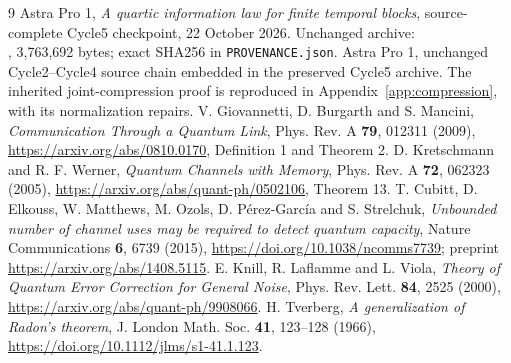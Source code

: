 \documentclass[11pt]{article}
\begin{document}
\appendix


\begin{thebibliography}{9}
 Astra Pro 1, \emph{A quartic information law for finite temporal
blocks}, source-complete Cycle5 checkpoint, 22 October 2026.
Unchanged archive:\\
,
3,763,692 bytes; exact SHA256 in \texttt{PROVENANCE.json}.
 Astra Pro 1, unchanged Cycle2--Cycle4 source chain embedded
in the preserved Cycle5 archive. The inherited joint-compression proof is
reproduced in Appendix~\ref{app:compression}, with its normalization repairs.
 V. Giovannetti, D. Burgarth and S. Mancini,
\emph{Communication Through a Quantum Link}, Phys. Rev. A \textbf{79},
012311 (2009), \url{https://arxiv.org/abs/0810.0170}, Definition 1 and Theorem 2.
 D. Kretschmann and R. F. Werner,
\emph{Quantum Channels with Memory}, Phys. Rev. A \textbf{72}, 062323
(2005), \url{https://arxiv.org/abs/quant-ph/0502106}, Theorem 13.
 T. Cubitt, D. Elkouss, W. Matthews, M. Ozols,
D. P\'erez-Garc\'ia and S. Strelchuk,
\emph{Unbounded number of channel uses may be required to detect quantum
capacity}, Nature Communications \textbf{6}, 6739 (2015),
\url{https://doi.org/10.1038/ncomms7739}; preprint
\url{https://arxiv.org/abs/1408.5115}.
 E. Knill, R. Laflamme and L. Viola,
\emph{Theory of Quantum Error Correction for General Noise},
Phys. Rev. Lett. \textbf{84}, 2525 (2000),
\url{https://arxiv.org/abs/quant-ph/9908066}.
 H. Tverberg, \emph{A generalization of Radon's theorem},
J. London Math. Soc. \textbf{41}, 123--128 (1966),
\url{https://doi.org/10.1112/jlms/s1-41.1.123}.
\end{thebibliography}
\end{document}

